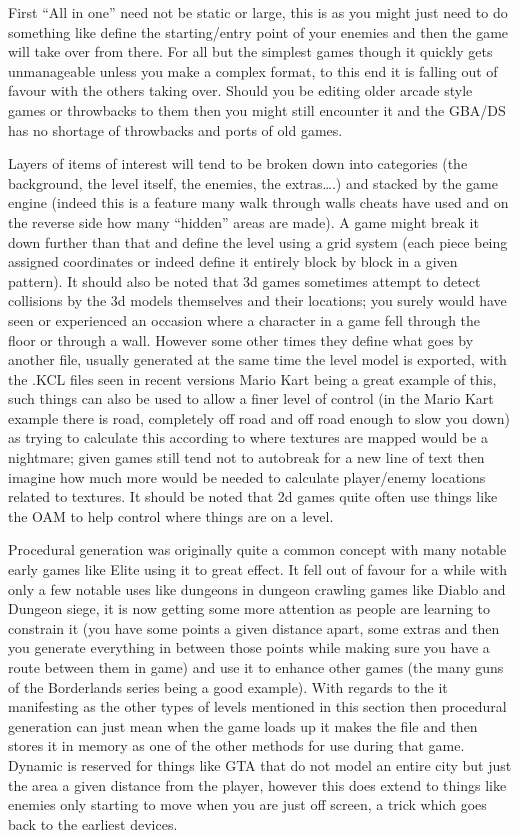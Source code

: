 \documentclass[
]{book}
\begin{document}
First ``All in one'' need not be static or large, this is as you might just need to do something like define the starting/entry point of your enemies and then the game will take over from there. For all but the simplest games though it quickly gets unmanageable unless you make a complex format, to this end it is falling out of favour with the others taking over. Should you be editing older arcade style games or throwbacks to them then you might still encounter it and the GBA/DS has no shortage of throwbacks and ports of old games.

Layers of items of interest will tend to be broken down into categories (the background, the level itself, the enemies, the extras\ldots.) and stacked by the game engine (indeed this is a feature many walk through walls cheats have used and on the reverse side how many ``hidden'' areas are made). A game might break it down further than that and define the level using a grid system (each piece being assigned coordinates or indeed define it entirely block by block in a given pattern). It should also be noted that 3d games sometimes attempt to detect collisions by the 3d models themselves and their locations; you surely would have seen or experienced an occasion where a character in a game fell through the floor or through a wall. However some other times they define what goes by another file, usually generated at the same time the level model is exported, with the .KCL files seen in recent versions Mario Kart being a great example of this, such things can also be used to allow a finer level of control (in the Mario Kart example there is road, completely off road and off road enough to slow you down) as trying to calculate this according to where textures are mapped would be a nightmare; given games still tend not to autobreak for a new line of text then imagine how much more would be needed to calculate player/enemy locations related to textures. It should be noted that 2d games quite often use things like the OAM to help control where things are on a level.

Procedural generation was originally quite a common concept with many notable early games like Elite using it to great effect. It fell out of favour for a while with only a few notable uses like dungeons in dungeon crawling games like Diablo and Dungeon siege, it is now getting some more attention as people are learning to constrain it (you have some points a given distance apart, some extras and then you generate everything in between those points while making sure you have a route between them in game) and use it to enhance other games (the many guns of the Borderlands series being a good example). With regards to the it manifesting as the other types of levels mentioned in this section then procedural generation can just mean when the game loads up it makes the file and then stores it in memory as one of the other methods for use during that game. Dynamic is reserved for things like GTA that do not model an entire city but just the area a given distance from the player, however this does extend to things like enemies only starting to move when you are just off screen, a trick which goes back to the earliest devices.
\end{document}
